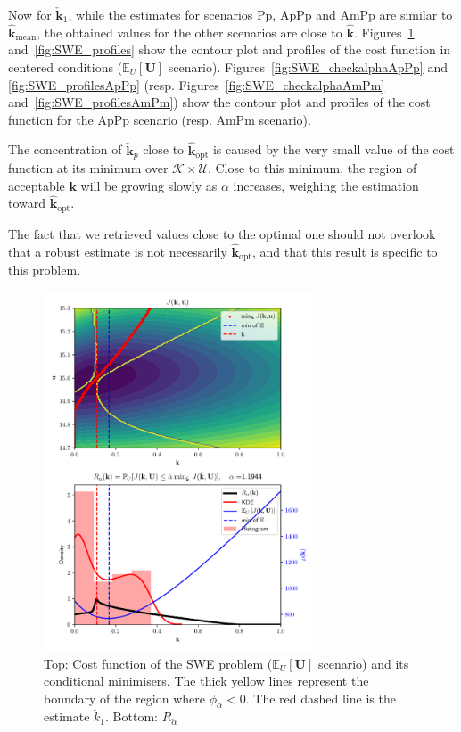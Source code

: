 \documentclass[npg, manuscript]{copernicus}
\newcommand{\Ex}{\mathbb{E}}
\begin{document}
Now for $\check{\mathbf{k}}_1$, while the estimates for scenarios Pp, ApPp and AmPp are similar to $\hat{\mathbf{k}}_{\mathrm{mean}}$, the obtained values for the other scenarios are close to $\hat{\mathbf{k}}$.
Figures~\ref{fig:SWE_checkalpha} and~\ref{fig:SWE_profiles} show the contour plot and profiles of the cost function in centered conditions ($\Ex_U[\mathbf{U}]$ scenario). Figures~\ref{fig:SWE_checkalphaApPp} and \ref{fig:SWE_profilesApPp} (resp. Figures~\ref{fig:SWE_checkalphaAmPm} and~\ref{fig:SWE_profilesAmPm}) show the contour plot and profiles of the cost function for the ApPp scenario (resp. AmPm scenario).

The concentration of $\check{\mathbf{k}}_p$ close to $\hat{\mathbf{k}}_{\mathrm{opt}}$ is caused by the very small value of the cost function at its minimum over $\mathcal{K}\times \mathcal{U}$. Close to this minimum, the region of acceptable $\mathbf{k}$ will be growing slowly as $\alpha$ increases, weighing the estimation toward $\hat{\mathbf{k}}_{\mathrm{opt}}$.

The fact that we retrieved values close to the optimal one should not overlook that a robust estimate is not necessarily $\hat{\mathbf{k}}_{\mathrm{opt}}$, and that this result is specific to this problem.

\clearpage
\begin{figure}[h]
\includegraphics[width=8cm]{Figures/SWE_big3.pdf}
\caption{Top: Cost function of the SWE problem ($\Ex_U[\mathbf{U}]$ scenario) and its conditional minimisers. The thick yellow lines represent the boundary of the region where $\phi_\alpha<0$. The red dashed line is the estimate $\check{k}_{1}$. Bottom: $R_{\check{\alpha}}$}
\label{fig:SWE_checkalpha}
\end{figure}
\end{document}
